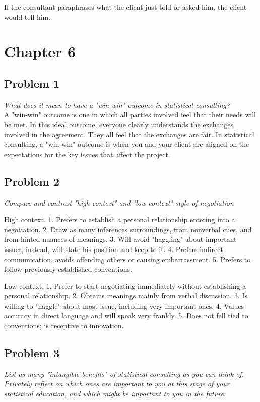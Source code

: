 \documentclass[a4paper,11pt]{article}
\begin{document}
If the consultant paraphrases what the client just told or asked him, the client would tell him.
\section*{Chapter 6}
\subsection*{Problem 1}
\emph{\indent What does it mean to have a "win-win" outcome in statistical consulting?}
\\

A "win-win" outcome is one in which all parties involved feel that their needs will be met. In this ideal outcome, everyone clearly understands the exchanges involved in the agreement. They all feel that the exchanges are fair. In statistical consulting,  a "win-win" outcome is when you and your client are aligned on the expectations for the key issues that affect the project.
\subsection*{Problem 2}
\emph{\indent Compare and contrast "high context" and "low context" style of negotiation}
\begin{paragraph}
{High context.} 1. Prefers to establish a personal relationship entering into a negotiation. 2. Draw as many inferences surroundings, from nonverbal cues, and from hinted nuances of meanings. 3. Will avoid "haggling" about important issues, instead, will state his position and keep to it. 4. Prefers indirect communication, avoids offending others or causing embarrassment. 5. Prefers to follow previously established conventions.
\end{paragraph}
\begin{paragraph}
  {Low context.} 1. Prefer to start negotiating immediately without establishing a personal relationship. 2. Obtains meanings mainly from verbal discussion. 3. Is willing to "haggle" about most issue, including very important ones. 4. Values accuracy in direct language and will speak very frankly. 5. Does not fell tied to conventions; is receptive to innovation.
\end{paragraph}
\subsection*{Problem 3}
\emph{\indent List as many "intangible benefits" of statistical consulting as you can think of. Privately reflect on which ones are important to you at this stage of your statistical education, and which might be important to you in the future.}
\\
\end{document}
